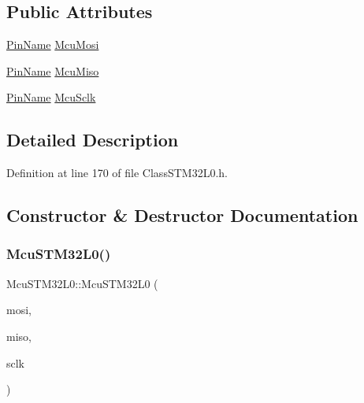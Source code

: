 \subsection*{Public Attributes}
\begin{DoxyCompactItemize}
\item 
\mbox{\hyperlink{_class_s_t_m32_l0_8h_a5ceb873075d76667eb54dc6a7d2734d1}{Pin\+Name}} \mbox{\hyperlink{class_mcu_s_t_m32_l0_ae51c54974f7c9805c92b303a56af819d}{Mcu\+Mosi}}
\item 
\mbox{\hyperlink{_class_s_t_m32_l0_8h_a5ceb873075d76667eb54dc6a7d2734d1}{Pin\+Name}} \mbox{\hyperlink{class_mcu_s_t_m32_l0_aa9c13e5d4ec21a3a1bafdfa87a31ec68}{Mcu\+Miso}}
\item 
\mbox{\hyperlink{_class_s_t_m32_l0_8h_a5ceb873075d76667eb54dc6a7d2734d1}{Pin\+Name}} \mbox{\hyperlink{class_mcu_s_t_m32_l0_a4162e63da5dfca06d192ee811157be3c}{Mcu\+Sclk}}
\end{DoxyCompactItemize}


\subsection{Detailed Description}


Definition at line 170 of file Class\+S\+T\+M32\+L0.\+h.



\subsection{Constructor \& Destructor Documentation}
\mbox{\label{class_mcu_s_t_m32_l0_ae747db3a6df937b07744e0ba492e1a23}} 
\subsubsection{\texorpdfstring{Mcu\+S\+T\+M32\+L0()}{McuSTM32L0()}}
{\footnotesize\ttfamily Mcu\+S\+T\+M32\+L0\+::\+Mcu\+S\+T\+M32\+L0 (\begin{DoxyParamCaption}\item[{\mbox{\hyperlink{_class_s_t_m32_l0_8h_a5ceb873075d76667eb54dc6a7d2734d1}{Pin\+Name}}}]{mosi,  }\item[{\mbox{\hyperlink{_class_s_t_m32_l0_8h_a5ceb873075d76667eb54dc6a7d2734d1}{Pin\+Name}}}]{miso,  }\item[{\mbox{\hyperlink{_class_s_t_m32_l0_8h_a5ceb873075d76667eb54dc6a7d2734d1}{Pin\+Name}}}]{sclk }\end{DoxyParamCaption})\hspace{0.3cm}{\ttfamily [inline]}}



